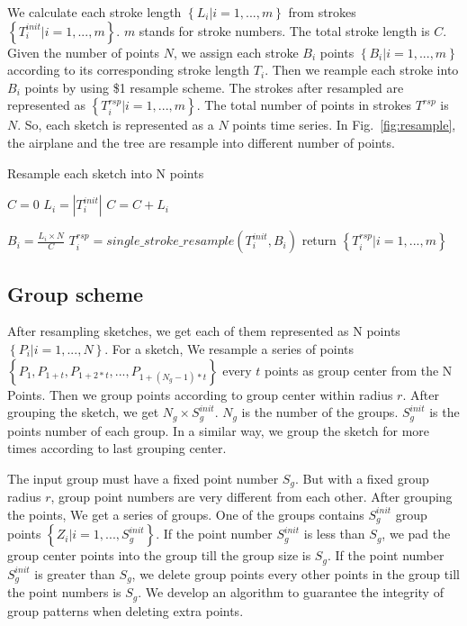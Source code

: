  We calculate each stroke length $\left\{ L_i| i = 1, ..., m \right\}$ from strokes $\left\{ T_i^{init}| i = 1, ..., m \right\}$. $m$ stands for stroke numbers. The total stroke length is $C$. Given the number of points $N$, we assign each stroke $B_i$ points $\left\{ B_i| i = 1, ..., m \right\}$ according to its corresponding stroke length $T_i$. Then we reample each stroke into $B_i$ points by using \$1 \cite{Wobbrock2007GesturesWL} resample scheme. The strokes after resampled are represented as $\left\{ T_i^{rsp}| i = 1, ..., m \right\}$. The total number of points in strokes $T^{rsp}$ is $N$. So, each sketch is represented as a $N$ points time series. In Fig.~\ref{fig:resample}, the airplane and the tree are resample into different number of points.

\begin{algorithm}
\label{alg:resample}
    \caption{Resample each sketch into N points}
    $C = 0$\;
    {
        $L_i = |T_i^{init}|$\;
        $C = C + L_i$\;
    }

    {
        $B_i = \frac{L_i \times N}{C}$\;
        $T_i^{rsp} = single\_stroke\_resample(T_i^{init}, B_i)$\;
    }
    return $\left\{ T_i^{rsp}| i = 1, ..., m \right\}$\;
\end{algorithm}



\subsection{Group scheme}
\label{ssec:group_scheme}

After resampling sketches, we get each of them represented as N points $\left\{P_i| i = 1,..., N\right\}$. For a sketch, We resample a series of points $\left\{P_{1}, P_{1+t}, P_{1+2*t}, ..., P_{1+(N_g-1)*t}\right\}$ every $t$ points as group center from the N Points. Then we group points according to group center within radius $r$. After grouping the sketch, we get $N_{g} \times S_{g}^{init}$. $N_{g}$ is the number of the groups. $S_{g}^{init}$ is the points number of each group. In a similar way, we group the sketch for more times according to last grouping center.

The input group must have a fixed point number $S_g$. But with a fixed group radius $r$, group point numbers are very different from each other. After grouping the points, We get a series of groups. One of the groups contains $S_g^{init}$ group points $\left\{ Z_i| i = 1, ..., S_g^{init} \right\}$. If the point number $S_g^{init}$ is less than $S_{g}$, we pad the group center points into the group till the group size is $S_{g}$. If the point number $S_g^{init}$ is greater than $S_{g}$, we delete group points every other points in the group till the point numbers is $S_{g}$. We develop an algorithm to guarantee the integrity of group patterns when deleting extra points.

